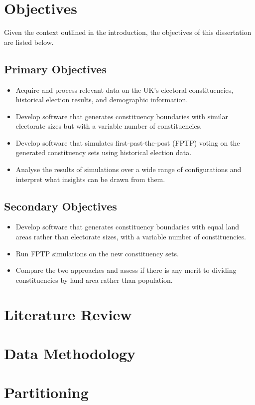 \documentclass{article}
\begin{document}
\section{Objectives}
Given the context outlined in the introduction, the objectives of this dissertation are listed below.
\subsection{Primary Objectives}
\begin{itemize}
    \item Acquire and process relevant data on the UK's electoral constituencies, historical election results, and demographic information.
    \item Develop software that generates constituency boundaries with similar electorate sizes but with a variable number of constituencies.
    \item Develop software that simulates first-past-the-post (FPTP) voting on the generated constituency sets using historical election data.
    \item Analyse the results of simulations over a wide range of configurations and interpret what insights can be drawn from them.
\end{itemize}
\subsection{Secondary Objectives}
\begin{itemize}
    \item Develop software that generates constituency boundaries with equal land areas rather than electorate sizes, with a variable number of constituencies.
    \item Run FPTP simulations on the new constituency sets.
    \item Compare the two approaches and assess if there is any merit to dividing constituencies by land area rather than population.
\end{itemize}

\section{Literature Review}

\section{Data Methodology}

\section{Partitioning}
\end{document}
